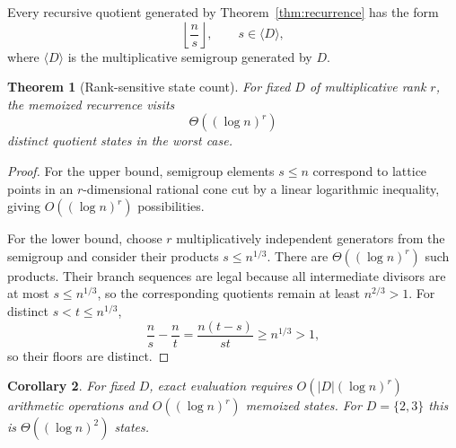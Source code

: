 \documentclass[11pt]{article}
\newtheorem{theorem}{Theorem}[section]
\newtheorem{corollary}[theorem]{Corollary}
\begin{document}
Every recursive quotient generated by Theorem~\ref{thm:recurrence} has the form
\[
 \left\lfloor\frac{n}{s}\right\rfloor,
\qquad s\in\langle D\rangle,
\]
where $\langle D\rangle$ is the multiplicative semigroup generated by $D$.

\begin{theorem}[Rank-sensitive state count]\label{thm:rank}
For fixed $D$ of multiplicative rank $r$, the memoized recurrence visits
\[
 \Theta((\log n)^r)
\]
distinct quotient states in the worst case.
\end{theorem}
\begin{proof}
For the upper bound, semigroup elements $s\le n$ correspond to lattice points in an $r$-dimensional rational cone cut by a linear logarithmic inequality, giving $O((\log n)^r)$ possibilities.

For the lower bound, choose $r$ multiplicatively independent generators from the semigroup and consider their products $s\le n^{1/3}$. There are $\Theta((\log n)^r)$ such products. Their branch sequences are legal because all intermediate divisors are at most $s\le n^{1/3}$, so the corresponding quotients remain at least $n^{2/3}>1$. For distinct $s<t\le n^{1/3}$,
\[
 \frac ns-\frac nt=\frac{n(t-s)}{st}\ge n^{1/3}>1,
\]
so their floors are distinct.
\end{proof}

\begin{corollary}
For fixed $D$, exact evaluation requires $O(|D|(\log n)^r)$ arithmetic operations and $O((\log n)^r)$ memoized states. For $D=\{2,3\}$ this is $\Theta((\log n)^2)$ states.
\end{corollary}
\end{document}
